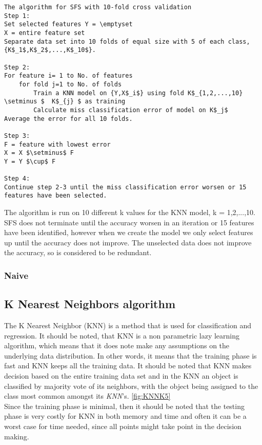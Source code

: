 \begin{lstlisting}[mathescape=true]
The algorithm for SFS with 10-fold cross validation
Step 1:
Set selected features Y = \emptyset
X = entire feature set
Separate data set into 10 folds of equal size with 5 of each class, {K$_1$,K$_2$,...,K$_10$}.

Step 2:
For feature i= 1 to No. of features
	for fold j=1 to No. of folds
		Train a KNN model on {Y,X$_i$} using fold K$_{1,2,...,10} \setminus $  K$_{j} $ as training
		Calculate miss classification error of model on K$_j$
Average the error for all 10 folds.

Step 3:
F = feature with lowest error
X = X $\setminus$ F
Y = Y $\cup$ F

Step 4:
Continue step 2-3 until the miss classification error worsen or 15 features have been selected.
\end{lstlisting}
The algorithm is run on 10 different k values for the KNN model, k = 1,2,...,10.
SFS does not terminate until the accuracy worsen in an iteration or 15 features have been identified, however when we create the model we only select features up until the accuracy does not improve. The unselected data does not improve the accuracy, so is considered to be redundant.


\subsubsection{Naive}


\subsection{K Nearest Neighbors algorithm}

The K Nearest Neighbor (KNN) is a method that is used for classification and regression. It should be noted, that KNN is a non parametric lazy learning algorithm, which means that it does note make any assumptions on the underlying data distribution. In other words, it means that the training phase is fast and KNN keeps all the training data. It should be noted that KNN makes decision based on the entire training data set and in the KNN an object is classified by majority vote of its neighbors, with the object being assigned to the class most common amongst its \textit{KNN}'s. \ref{fig:KNNK5}\\
Since the training phase is minimal, then it should be noted that the testing phase is very costly for KNN in both memory and time and often it can be a worst case for time needed, since all points might take point in the decision making.

